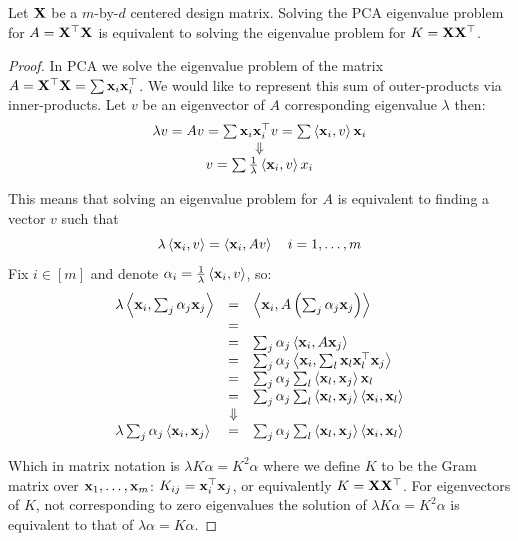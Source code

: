 \begin{claim}
Let $\mathbf{X}$ be a $m$-by-$d$ centered design matrix. Solving the PCA eigenvalue problem for $A=\mathbf{X}^\top\mathbf{X}$ is equivalent to solving the eigenvalue problem for $K=\mathbf{X}\mathbf{X}^\top$.
\end{claim}
\begin{proof}

In PCA we solve the eigenvalue problem of the matrix $A=\mathbf{X}^\top\mathbf{X}=\sum\mathbf{x}_i\mathbf{x}_i^\top$. We would like to represent this sum of outer-products via inner-products. Let $v$ be an eigenvector of $A$ corresponding eigenvalue $\lambda$ then: $$ \begin{array}{c} \lambda v = Av = \sum \mathbf{x}_i\mathbf{x}_i^\top v = \sum \left\langle \mathbf{x}_i,v\right\rangle\mathbf{x}_i \\ \Downarrow \\ v = \sum \frac{1}{\lambda} \left\langle \mathbf{x}_i,v\right\rangle x_i \end{array} $$

This means that solving an eigenvalue problem for $A$ is equivalent to finding a vector $v$ such that $$ \lambda\left\langle \mathbf{x}_i,v\right\rangle = \left\langle \mathbf{x}_i,Av\right\rangle\quad i=1,\ldots,m$$
Fix $i\in\left[m\right]$ and denote $\alpha_i = \frac{1}{\lambda}\left\langle \mathbf{x}_i,v\right\rangle$, so:
\begin{align}
\begin{array}{lcl}
\lambda\left\langle \mathbf{x}_i,\sum_j \alpha_j\mathbf{x}_j\right\rangle & = & \left\langle \mathbf{x}_i,A\left(\sum_j \alpha_j\mathbf{x}_j\right)\right\rangle\\
& = & \\
& = & \sum_j \alpha_j \left\langle \mathbf{x}_i,A\mathbf{x}_j\right\rangle\\
& = & \sum_j \alpha_j \left\langle \mathbf{x}_i,\sum_l \mathbf{x}_l\mathbf{x}_l^\top \mathbf{x}_j\right\rangle\\
& = & \sum_j \alpha_j \sum_l\left\langle \mathbf{x}_l,\mathbf{x}_j\right\rangle\mathbf{x}_l\\
& = & \sum_j \alpha_j \sum_l \left\langle \mathbf{x}_l,\mathbf{x}_j\right\rangle\left\langle \mathbf{x}_i,\mathbf{x}_l\right\rangle\\
& \Downarrow &\\
\lambda\sum_j \alpha_j\left\langle \mathbf{x}_i,\mathbf{x}_j\right\rangle & = & \sum_j \alpha_j \sum_l \left\langle \mathbf{x}_l,\mathbf{x}_j\right\rangle\left\langle \mathbf{x}_i,\mathbf{x}_l\right\rangle \label{eqn:kernel_pca_1}
\end{array}
\end{align}

Which in matrix notation is $\lambda K \alpha = K^2 \alpha$ where we define $K$ to be the Gram matrix over $\mathbf{x}_1,\ldots,\mathbf{x}_m$: $K_{ij} = \mathbf{x}_i^\top\mathbf{x}_j$, or equivalently $K=\mathbf{X}\mathbf{X}^\top$. For eigenvectors of $K$, not corresponding to zero eigenvalues the solution of $\lambda K \alpha = K^2 \alpha$ is equivalent to that of $\lambda \alpha = K \alpha$.
\end{proof}


